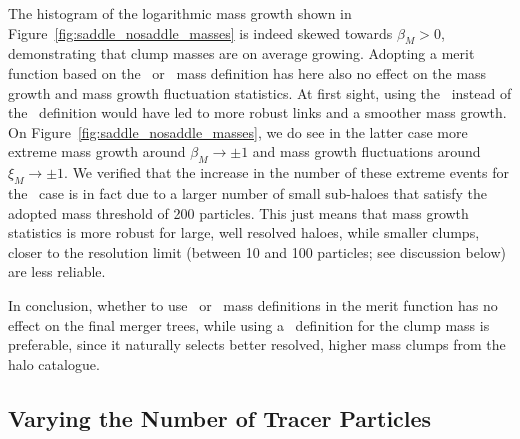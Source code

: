 The histogram of the logarithmic mass growth shown in
Figure~\ref{fig:saddle_nosaddle_masses} is indeed skewed towards
$\beta_M > 0$, demonstrating that clump masses are on average growing.
Adopting a merit function based on the \inc\ or \exc\ mass definition
has here also no effect on the mass growth and mass growth fluctuation
statistics.  At first sight, using the \sad\ instead of the
\nosad\ definition would have led to more robust links and a smoother
mass growth. On Figure~\ref{fig:saddle_nosaddle_masses}, we do see in
the latter case more extreme mass growth around $\beta_M \rightarrow
\pm 1$ and mass growth fluctuations around $\xi_M \rightarrow \pm
1$. We verified that the increase in the number of these extreme
events for the \nosad\ case is in fact due to a larger number of small
sub-haloes that satisfy the adopted mass threshold of 200 particles.
This just means that mass growth statistics is more robust for large,
well resolved haloes, while smaller clumps, closer to the resolution
limit (between 10 and 100 particles; see discussion below) are less
reliable.

In conclusion, whether to use \inc\ or \exc\ mass definitions in the
merit function has no effect on the final merger trees, while using a
\sad\ definition for the clump mass is preferable, since it naturally
selects better resolved, higher mass clumps from the halo catalogue.

\subsection{Varying the Number of Tracer Particles} \label{chap:testing-nmb}





